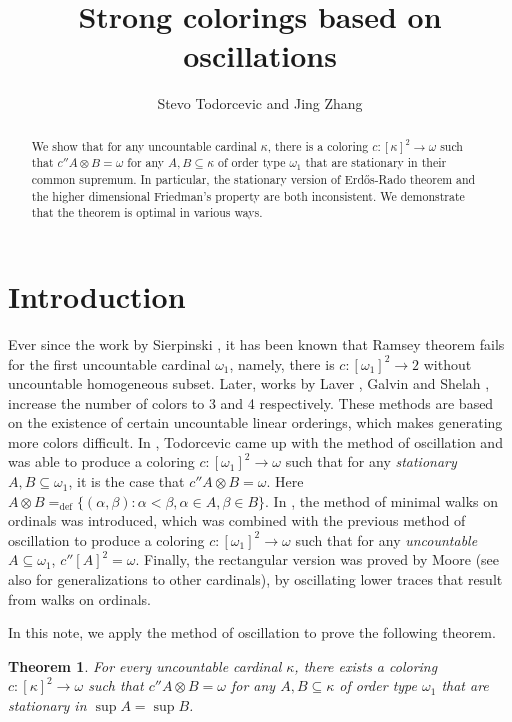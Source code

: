 \documentclass[12pt]{amsart}
\title{Strong colorings based on oscillations}
\author{Stevo Todorcevic and Jing Zhang}
\date{}
\theoremstyle{definition}
\theoremstyle{plain}
\theoremstyle{plain}
\newtheorem{theorem}[definition]{Theorem}
\begin{document}
\maketitle
\begin{abstract}
We show that for any uncountable cardinal $\kappa$, there is a coloring $c: [\kappa]^2\to \omega$ such that $c''A \otimes B = \omega$ for any $A, B\subseteq \kappa$ of order type $\omega_1$ that are stationary in their common supremum. In particular, the stationary version of Erd\H{o}s-Rado theorem and the higher dimensional Friedman's property are both inconsistent. We demonstrate that the theorem is optimal in various ways.
\end{abstract}

\section{Introduction}
Ever since the work by Sierpinski \cite{Sierpinski}, it has been known that Ramsey theorem fails for the first uncountable cardinal $\omega_1$, namely, there is $c: [\omega_1]^2\to 2$ without uncountable homogeneous subset. Later, works by Laver \cite{LaverPartition}, Galvin and Shelah \cite{GalvinShelah}, increase the number of colors to 3 and 4 respectively. These methods are based on the existence of certain uncountable linear orderings, which makes generating more colors difficult. In \cite{TodorcevicFirstOscillation}, Todorcevic came up with the method of oscillation and was able to produce a coloring $c: [\omega_1]^2\to \omega$ such that for any \emph{stationary} $A, B\subseteq \omega_1$, it is the case that $c'' A\otimes B = \omega$. Here $A\otimes B =_{\mathrm{def}}\{(\alpha,\beta): \alpha<\beta, \alpha\in A, \beta\in B\}$. In \cite{TodorcevicWalks87}, the method of minimal walks on ordinals was introduced, which was combined with the previous method of oscillation to produce a coloring $c: [\omega_1]^2\to \omega$ such that for any \emph{uncountable} $A\subseteq \omega_1$, $c''[A]^2 =\omega$. Finally, the rectangular version was proved by Moore \cite{MooreLspace} (see also \cite{RinotTodorcevic} for generalizations to other cardinals), by oscillating lower traces that result from walks on ordinals.


In this note, we apply the method of oscillation to prove the following theorem.

\begin{theorem}\label{theorem: main}
For every uncountable cardinal $\kappa$, there exists a coloring $c: [\kappa]^2\to \omega$ such that  $c'' A \otimes B = \omega$ for any $A, B\subseteq \kappa$ of order type $\omega_1$ that are stationary in $\sup A = \sup B$.
\end{theorem}
\end{document}
